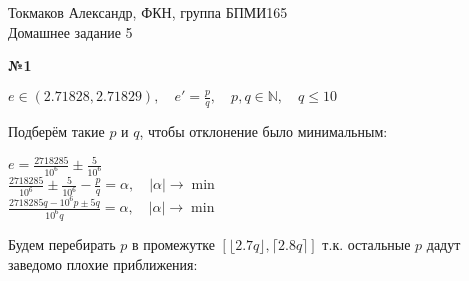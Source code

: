 \documentclass{article}
\newenvironment{task}{\begin{center}\fontsize{14}{14}\selectfont\bf}{\rm\fontsize{12}{12}\selectfont\end{center}}
\newcommand{\N}{\mathbb{N}}
\begin{document}
	\begin{center}
		Токмаков Александр, ФКН, группа БПМИ165 \\
		Домашнее задание 5
	\end{center}
	
	\begin{task} 
		№1
	\end{task}
	\begin{center}
		$e \in (2.71828,  	2.71829), \quad e' = \frac{p}{q}, \quad p, q \in \N, \quad q \leq 10$\\
	\end{center}
	Подберём такие $p$ и $q$, чтобы отклонение было минимальным: 
	\begin{center}
		$e = \frac{2718285}{10^{6}} \pm \frac{5}{10^{6}}$ \\
		$\frac{2718285}{10^{6}} \pm \frac{5}{10^{6}} - \frac{p}{q} = \alpha, \quad |\alpha| \rightarrow \min$ \\
		$\frac{2718285q - 10^{6}p \pm 5q}{10^{6}q}= \alpha, \quad |\alpha| \rightarrow \min$ \\
	\end{center}
	Будем перебирать $p$ в промежутке $[\lfloor2.7q\rfloor, \lceil2.8q\rceil]$ т.к. остальные $p$ дадут заведомо плохие приближения:
\end{document}
